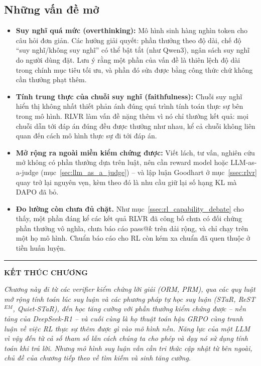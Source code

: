 \subsection{Những vấn đề mở}
\label{ssec:reasoning_open_problems}
\begin{itemize}
	\item \textbf{Suy nghĩ quá mức (overthinking):} Mô hình sinh hàng nghìn token cho câu hỏi đơn giản. Các hướng giải quyết: phần thưởng theo độ dài, chế độ ``suy nghĩ/không suy nghĩ'' có thể bật tắt (như Qwen3), ngân sách suy nghĩ do người dùng đặt. Lưu ý rằng một phần của vấn đề là thiên lệch độ dài trong chính mục tiêu tối ưu, và phần đó sửa được bằng công thức chứ không cần thưởng phạt thêm.
	\item \textbf{Tính trung thực của chuỗi suy nghĩ (faithfulness):} Chuỗi suy nghĩ hiển thị không nhất thiết phản ánh đúng quá trình tính toán thực sự bên trong mô hình. RLVR làm vấn đề nặng thêm vì nó chỉ thưởng kết quả: mọi chuỗi dẫn tới đáp án đúng đều được thưởng như nhau, kể cả chuỗi không liên quan đến cách mô hình thực sự đi tới đáp án.
	\item \textbf{Mở rộng ra ngoài miền kiểm chứng được:} Viết lách, tư vấn, nghiên cứu mở không có phần thưởng dựa trên luật, nên cần reward model hoặc LLM-as-a-judge (mục~\ref{sec:llm_as_a_judge}) -- và lập luận Goodhart ở mục~\ref{ssec:rlvr} quay trở lại nguyên vẹn, kèm theo đó là nhu cầu giữ lại số hạng KL mà DAPO đã bỏ.
	\item \textbf{Đo lường còn chưa đủ chặt.} Như mục~\ref{ssec:rl_capability_debate} cho thấy, một phần đáng kể các kết quả RLVR đã công bố chưa có đối chứng phần thưởng vô nghĩa, chưa báo cáo pass@$k$ trên dải rộng, và chỉ chạy trên một họ mô hình. Chuẩn báo cáo cho RL còn kém xa chuẩn đã quen thuộc ở tiền huấn luyện.
\end{itemize}

\bigskip
\hrule
\bigskip

\begin{center}
    \textbf{\Large KẾT THÚC CHƯƠNG \thechapter}
\end{center}

\textit{Chương này đi từ các verifier kiểm chứng lời giải (ORM, PRM), qua các quy luật mở rộng tính toán lúc suy luận và các phương pháp tự học suy luận (STaR, ReST$^{EM}$, Quiet-STaR), đến học tăng cường với phần thưởng kiểm chứng được -- nền tảng của DeepSeek-R1 -- và cuối cùng là họ thuật toán hậu GRPO cùng tranh luận về việc RL thực sự thêm được gì vào mô hình nền. Năng lực của một LLM vì vậy đến từ cả số tham số lẫn cách chúng ta cho phép và dạy nó sử dụng tính toán khi trả lời. Nhưng mô hình suy luận vẫn cần tri thức cập nhật từ bên ngoài, chủ đề của chương tiếp theo về tìm kiếm và sinh tăng cường.}
